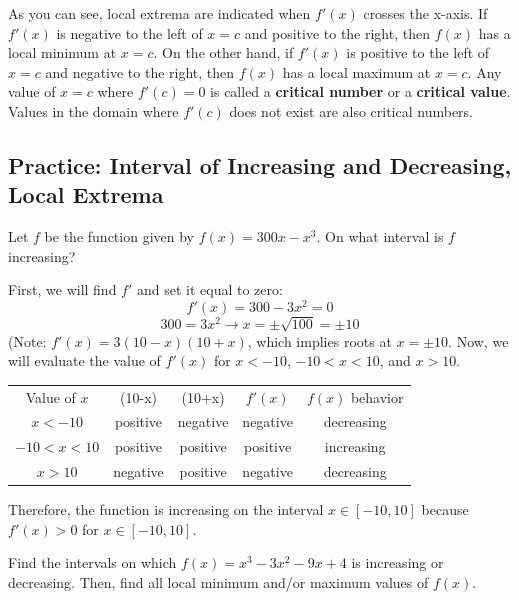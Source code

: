 As you can see, local extrema are indicated when $f'(x)$ crosses the x-axis. 
If $f'(x)$ is negative to the left of $x=c$ and positive to the right, then 
$f(x)$ has a local minimum at $x=c$. On the other hand, if $f'(x)$ is positive 
to the left of $x=c$ and negative to the right, then $f(x)$ has a local 
maximum at $x=c$. Any value of $x=c$ where $f'(c) = 0$ is called a \textbf{
critical number} or a \textbf{critical value}. Values in the domain where $f'(c)$ does not 
exist are also critical numbers. 

\subsection{Practice: Interval of Increasing and Decreasing, Local Extrema}
\begin{Exercise}
    [label=incdec1]
    Let $f$ be the function given by $f(x) = 300x-x^3$. On what interval is $f$ increasing?
\end{Exercise}

\begin{Answer}
    [ref=incdec1]
    First, we will find $f'$ and set it equal to zero: $$f'(x) = 300 - 3x^2 = 
    0$$ $$300=3x^2 \rightarrow x=\pm \sqrt{100} = \pm10$$ (Note: $f'(x) = 3(10 
    - x)(10 + x)$, which implies roots at $x=\pm10$. Now, we will evaluate the 
    value of $f'(x)$ for $x < -10$, $-10 < x < 10$, and $ x >10$. 
    \begin{center}
        \begin{tabular}{c|c|c|c|c}
        Value of $x$ & (10-x) & (10+x) & $f'(x)$ & $f(x)$ behavior\\
         $x<-10$    &  positive & negative& negative & decreasing\\
         $-10<x<10$    & positive & positive& positive& increasing\\
         $x>10$ & negative & positive & negative & decreasing
        \end{tabular}
    \end{center}
    Therefore, the function is increasing on the interval $x \in [-10, 10]$ 
    because $f'(x) >0$ for $x \in [-10, 10]$.
\end{Answer}

\begin{Exercise}[label=locext1]
Find the intervals on which $f(x)=x^3-3x^2-9x+4$ is increasing or decreasing. 
Then, find all local minimum and/or maximum values of $f(x)$. 
\end{Exercise}

